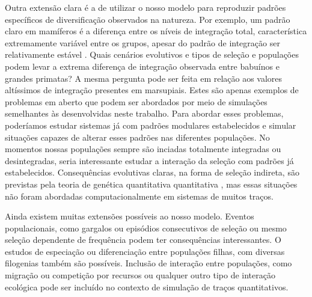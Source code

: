Outra extensão clara é a de utilizar o nosso modelo para reproduzir
padrões específicos de diversificação observados na natureza. 
Por exemplo, um padrão claro em mamíferos é a diferença entre os níveis
de integração total, característica extremamente variável entre os
grupos, apesar do padrão de integração ser relativamente estável
\cite{Porto2008}. 
Quais cenários evolutivos e tipos de seleção e populações podem levar a
extrema diferença de integração observada entre babuínos e grandes
primatas?
A mesma pergunta pode ser feita em relação aos valores altíssimos de
integração presentes em marsupiais. 
Estes são apenas exemplos de problemas em aberto que podem ser abordados
por meio de simulações semelhantes às desenvolvidas neste trabalho. 
Para abordar esses problemas, poderíamos estudar sistemas já com padrões
modulares estabelecidos e simular situações capazes de alterar esses padrões 
nas diferentes populações. 
No momentos nossas populações sempre são inciadas totalmente integradas
ou desintegradas, seria interessante estudar a interação da seleção com
padrões já estabelecidos.
Consequências evolutivas claras, na forma de seleção indireta, são
previstas pela teoria de genética quantitativa quantitativa
\citep{Lande1983, Barton1987}, mas essas situações não foram abordadas
computacionalmente em sistemas de muitos traços.

Ainda existem muitas extensões possíveis ao nosso modelo. 
Eventos populacionais, como gargalos ou episódios consecutivos de
seleção ou mesmo seleção dependente de frequência podem ter
consequências interessantes. 
O estudos de especiação ou diferenciação entre populações filhas, com
diversas filogenias também são possíveis. 
Inclusão de interação entre populações, como migração ou competição por
recursos ou qualquer outro tipo de interação ecológica pode ser incluído
no contexto de simulação de traços quantitativos. 
